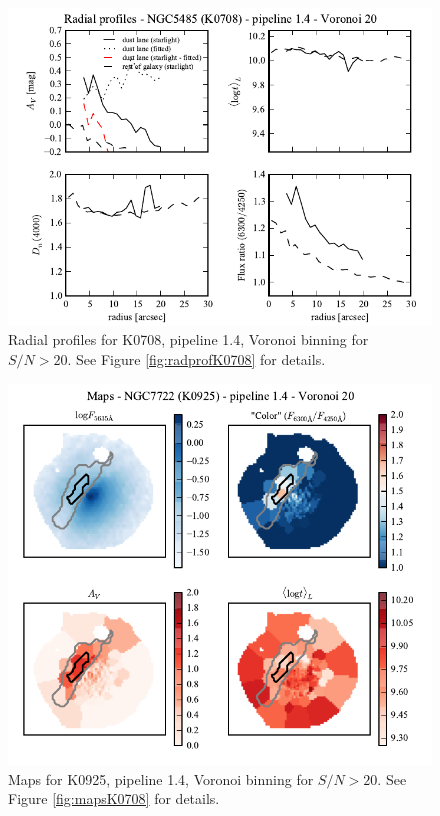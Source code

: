 \documentclass[a4paper]{article}
\begin{document}
\begin{figure}[H]
\includegraphics{figures/radprof_K0708_1.4_v20.pdf}
\caption{Radial profiles for K0708, pipeline 1.4, Voronoi binning for $S/N >
20$. See Figure \ref{fig:radprofK0708} for details.}
\end{figure}

\begin{figure}[H]
\includegraphics{figures/maps_K0925_1.4_v20.pdf}
\caption{Maps for K0925, pipeline 1.4, Voronoi binning for $S/N > 20$. See
Figure \ref{fig:mapsK0708} for details.}
\end{figure}
\end{document}
